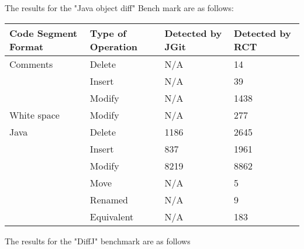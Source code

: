 The results for the "Java object diff" Bench mark are as follows:

\begin{table}[H]
    \begin{tabular}{llll}
    Code Segment Format & Type of Operation & Detected by JGit & Detected by RCT \\ \hline
    Comments            & Delete            & N/A              & 14              \\
    ~                   & Insert            & N/A              & 39              \\
    ~                   & Modify            & N/A              & 1438            \\
    White space         & Modify            & N/A              & 277             \\
    Java                & Delete            & 1186             & 2645            \\
    ~                   & Insert            & 837              & 1961            \\
    ~                   & Modify            & 8219             & 8862            \\
    ~                   & Move              & N/A              & 5               \\
    ~                   & Renamed           & N/A              & 9               \\
    ~                   & Equivalent        & N/A              & 183             \\
    \end{tabular}
\end{table}

The results for the "DiffJ" benchmark are as follows

